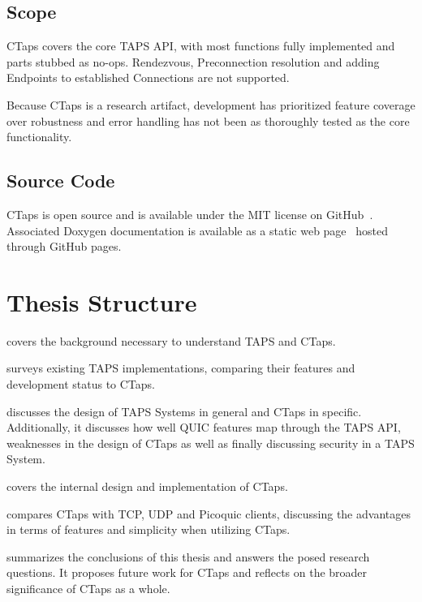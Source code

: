 \subsection{Scope}
CTaps covers the core TAPS API, with most functions fully implemented and parts
stubbed as no-ops. Rendezvous, Preconnection resolution and adding Endpoints to
established Connections are not supported.

Because CTaps is a research artifact, development has prioritized feature coverage over robustness
and error handling has not been as thoroughly tested as the core functionality.

\subsection{Source Code}
CTaps is open source and is available under the MIT license
on GitHub~\cite{cTaps}. Associated Doxygen documentation is available
as a static web page~\cite{ctapsDocs} hosted through GitHub pages.

\section{Thesis Structure}
\textbf{} covers the background necessary to understand
TAPS and CTaps.

\textbf{} surveys existing TAPS implementations,
comparing their features and development status to CTaps.

\textbf{} discusses the design of TAPS Systems
in general and CTaps in specific. Additionally, it discusses how well QUIC
features map through the TAPS API, weaknesses in the design of CTaps as well
as finally discussing security in a TAPS System.

\textbf{} covers the internal design and implementation of
CTaps.

\textbf{} compares CTaps with TCP, UDP and Picoquic clients, discussing
the advantages in terms of features and simplicity when utilizing CTaps.

\textbf{} summarizes the conclusions of this thesis
and answers the posed research questions. It proposes future work
for CTaps and reflects on the broader significance of CTaps as a whole.
